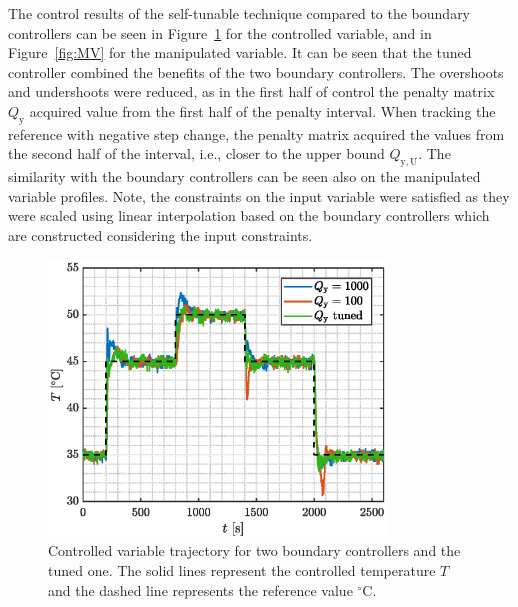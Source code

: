 \documentclass[preprint,12pt]{elsarticle}
\begin{document}
The control results of the self-tunable technique compared to the boundary controllers can be seen in Figure~\ref{fig:CV} for the controlled variable, and in Figure~\ref{fig:MV} for the manipulated variable. It can be seen that the tuned controller combined the benefits of the two boundary controllers. The overshoots and undershoots were reduced, as in the first half of control the penalty matrix $Q_\mathrm{y}$ acquired value from the first half of the penalty interval. When tracking the reference with negative step change, the penalty matrix acquired the values from the second half of the interval, i.e., closer to the upper bound $Q_\mathrm{y, U}$. 
The similarity with the boundary controllers can be seen also on the manipulated variable profiles. Note, the constraints on the input variable were satisfied as they were scaled using linear interpolation based on the boundary controllers which are constructed considering the input constraints. 

\begin{figure}
	\begin{center}
		\includegraphics[width=0.8\textwidth]{images/CV}
		\caption{Controlled variable trajectory for two boundary controllers and the tuned one. The solid lines represent the controlled temperature $T$ and the dashed line represents the reference value $^{\circ}\mathrm{C}$.}
		\label{fig:CV}
	\end{center}
\end{figure}
\end{document}
